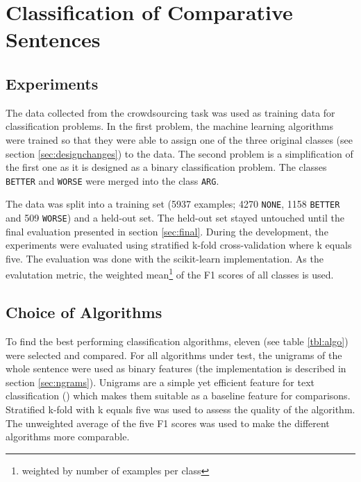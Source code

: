 \chapter{Classification of Comparative Sentences}
\section{Experiments}
The data collected from the crowdsourcing task was used as training data for classification problems. In the first problem, the machine learning algorithms were trained so that they were able to assign one of the three original classes (see section \ref{sec:designchanges}) to the data. The second problem is a simplification of the first one as it is designed as a binary classification problem. The classes \texttt{BETTER} and \texttt{WORSE} were merged into the class \texttt{ARG}.


The data was split into a training set (5937 examples; 4270 \texttt{NONE}, 1158 \texttt{BETTER} and 509 \texttt{WORSE}) and a held-out set. The held-out set stayed untouched until the final evaluation presented in section \ref{sec:final}. During the development, the experiments were evaluated using stratified k-fold cross-validation where k equals five. The evaluation was done with the scikit-learn implementation. As the evalutation metric, the weighted mean\footnote{weighted by number of examples per class} of the F1 scores of all classes is used. 

\section{Choice of Algorithms}

To find the best performing classification algorithms, eleven (see table \ref{tbl:algo}) were selected and compared. For all algorithms under test, the unigrams of the whole sentence were used as binary features (the implementation is described in section \ref{sec:ngrams}). Unigrams are a simple yet efficient feature for text classification (\cite{cavnar1994n}) which makes them suitable as a baseline feature for comparisons. Stratified k-fold with k equals five was used to assess the quality of the algorithm. The unweighted average of the five F1 scores was used to make the different algorithms more comparable.

